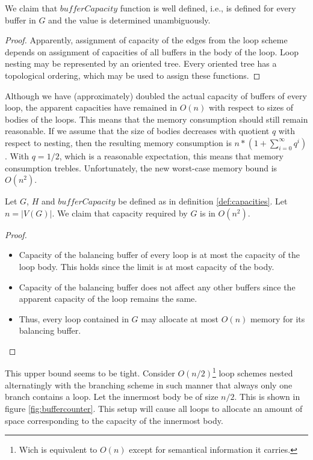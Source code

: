 \myenddef

We claim that $bufferCapacity$ function is well defined, i.e., is defined for every buffer in $G$ and the value is determined unambiguously.
  \begin{proof}
    Apparently, assignment of capacity of the edges from the loop scheme depends on assignment of capacities of all buffers in the body of the loop. Loop nesting may be represented by an oriented tree. Every oriented tree has a topological ordering, which may be used to assign these functions.
  \end{proof}
\myendclaim

  Although we have (approximately) doubled the actual capacity of buffers of every loop, the apparent capacities have remained in $O(n)$ with respect to sizes of bodies of the loops. This means that the memory consumption should still remain reasonable. If we assume that the size of bodies decreases with quotient $q$ with respect to nesting, then the resulting memory consumption is $n*(1+\sum_{i=0}^{\infty}q^i)$. With $q=1/2$, which is a reasonable expectation, this means that memory consumption trebles. Unfortunately, the new worst-case memory bound is $O(n^2)$.

  Let $G$, $H$ and $bufferCapacity$ be defined as in definition \ref{def:capacities}. Let $n=| V(G) |$. We claim that capacity required by $G$ is in $O(n^2)$. 
  \begin{proof}\ 
    \begin{itemize}
      \item Capacity of the balancing buffer of every loop is at most the capacity of the loop body. This holds since the limit is at most capacity of the body.
      \item Capacity of the balancing buffer does not affect any other buffers since the apparent capacity of the loop remains the same.
      \item Thus, every loop contained in $G$ may allocate at most $O(n)$ memory for its balancing buffer.
    \end{itemize}
  \end{proof}
\myendclaim

This upper bound seems to be tight. Consider $O(n/2)$\footnote{Wich is equivalent to $O(n)$ except for semantical information it carries.} loop schemes nested alternatingly with the branching scheme in such manner that always only one branch contains a loop. Let the innermost body be of size $n/2$. This is shown in figure \ref{fig:buffercounter}. This setup will cause all loops to allocate an amount of space corresponding to the capacity of the innermost body.

